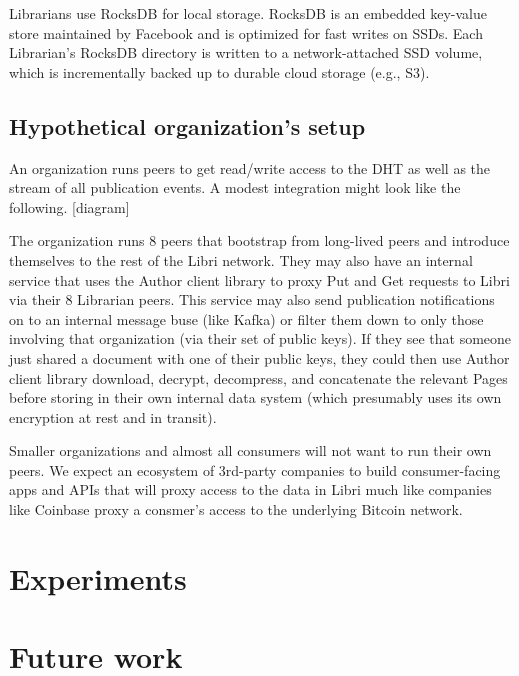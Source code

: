 \documentclass[10pt]{article}
\begin{document}
Librarians use RocksDB for local storage. RocksDB is an embedded key-value store maintained by Facebook and is optimized for fast writes on SSDs. Each Librarian's RocksDB directory is written to a network-attached SSD volume, which is incrementally backed up to durable cloud storage (e.g., S3). 


\subsection{Hypothetical organization's setup}

An organization runs peers to get read/write access to the DHT as well as the stream of all publication events. A modest integration might look like the following. [diagram]

The organization runs 8 peers that bootstrap from long-lived peers and introduce themselves to the rest of the Libri network. They may also have an internal service that uses the Author client library to proxy Put and Get requests to Libri via their 8 Librarian peers. This service may also send publication notifications on to an internal message buse (like Kafka) or filter them down to only those involving that organization (via their set of public keys). If they see that someone just shared a document with one of their public keys, they could then use Author client library download, decrypt, decompress, and concatenate the relevant Pages before storing in their own internal data system (which presumably uses its own encryption at rest and in transit).

Smaller organizations and almost all consumers will not want to run their own peers. We expect an ecosystem of 3rd-party companies to build consumer-facing apps and APIs that will proxy access to the data in Libri much like companies like Coinbase proxy a consmer's access to the underlying Bitcoin network.


\section{Experiments}

\section{Future work}
\end{document}
